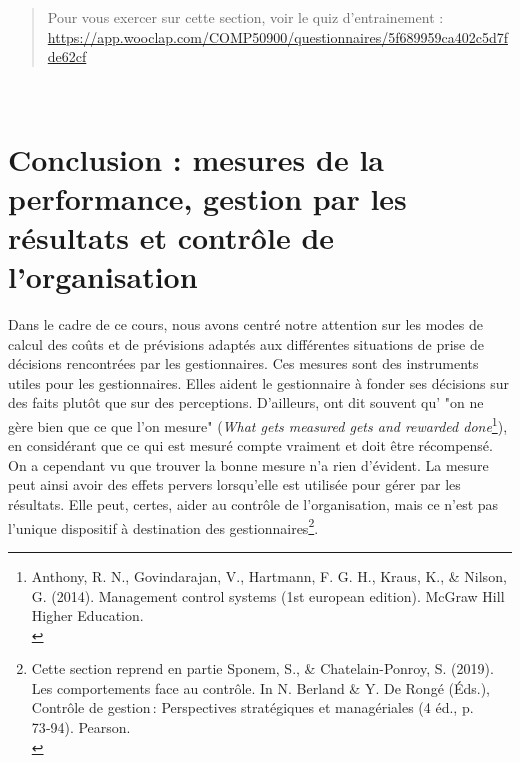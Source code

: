 \documentclass{kaobook}
\begin{document}
\begin{quote}
Pour vous exercer sur cette section, voir le quiz d'entrainement : \url{https://app.wooclap.com/COMP50900/questionnaires/5f689959ca402c5d7fde62cf}\\
\end{quote}

\clearpage\\
\chapter{Conclusion : mesures de la performance, gestion par les résultats et contrôle de l'organisation}
\label{sec:org3f1fa85}
Dans le cadre de ce cours, nous avons centré notre attention sur les modes de calcul des coûts et de prévisions adaptés aux différentes situations de prise de décisions rencontrées par les gestionnaires. Ces mesures sont des instruments utiles pour les gestionnaires. Elles aident le gestionnaire à fonder ses décisions sur des faits plutôt que sur des perceptions. D'ailleurs, ont dit souvent qu' "on ne gère bien que ce que l'on mesure" (\emph{What gets measured gets and rewarded done}\footnote{Anthony, R. N., Govindarajan, V., Hartmann, F. G. H., Kraus, K., \& Nilson, G. (2014). Management control systems (1st european edition). McGraw Hill Higher Education.\\}), en considérant que ce qui est mesuré compte vraiment et doit être récompensé.\\

On a cependant vu que trouver la bonne mesure n'a rien d’évident. La mesure peut ainsi avoir des effets pervers lorsqu'elle est utilisée pour gérer par les résultats. Elle peut, certes, aider au contrôle de l'organisation, mais ce n'est pas l'unique dispositif à destination des gestionnaires\footnote{Cette section reprend en partie Sponem, S., \& Chatelain-Ponroy, S. (2019). Les comportements face au contrôle. In N. Berland \& Y. De Rongé (Éds.), Contrôle de gestion : Perspectives stratégiques et managériales (4 éd., p. 73‑94). Pearson.\\}.\\
\end{document}
